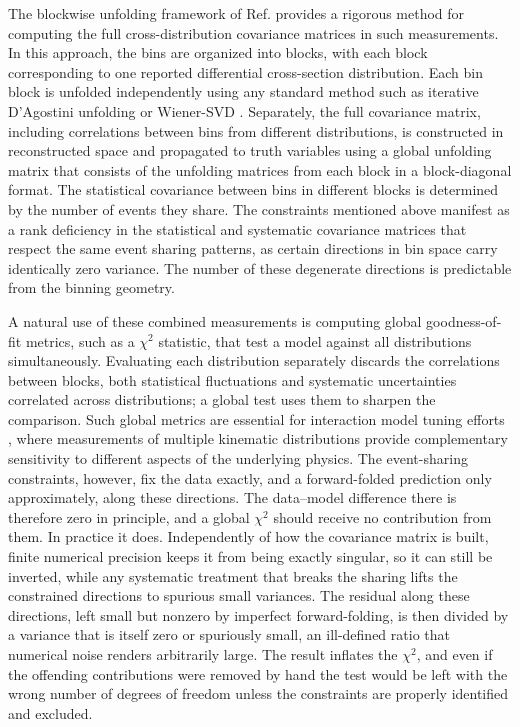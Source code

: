 \documentclass[a4paper,11pt]{article}
\begin{document}
The blockwise unfolding framework of Ref. \cite{Gardiner:2024gdy} provides a rigorous method for computing the full cross-distribution covariance matrices in such measurements. In this approach, the bins are organized into blocks, with each block corresponding to one reported differential cross-section distribution. Each bin block is unfolded independently using any standard method such as iterative D'Agostini unfolding \cite{DAgostini:1994fjx} or Wiener-SVD \cite{Tang:2017rob}. Separately, the full covariance matrix, including correlations between bins from different distributions, is constructed in reconstructed space and propagated to truth variables using a global unfolding matrix that consists of the unfolding matrices from each block in a block-diagonal format. The statistical covariance between bins in different blocks is determined by the number of events they share. The constraints mentioned above manifest as a rank deficiency in the statistical and systematic covariance matrices that respect the same event sharing patterns, as certain directions in bin space carry identically zero variance. The number of these degenerate directions is predictable from the binning geometry.

A natural use of these combined measurements is computing global goodness-of-fit metrics, such as a $\chi^{2}$ statistic, that test a model against all distributions simultaneously. Evaluating each distribution separately discards the correlations between blocks, both statistical fluctuations and systematic uncertainties correlated across distributions; a global test uses them to sharpen the comparison. Such global metrics are essential for interaction model tuning efforts \cite{Wilkinson:2016wmz,MINERvA:2019kfr,GENIE:2022qrc}, where measurements of multiple kinematic distributions provide complementary sensitivity to different aspects of the underlying physics. The event-sharing constraints, however, fix the data exactly, and a forward-folded prediction only approximately, along these directions. The data--model difference there is therefore zero in principle, and a global $\chi^{2}$ should receive no contribution from them. In practice it does. Independently of how the covariance matrix is built, finite numerical precision keeps it from being exactly singular, so it can still be inverted, while any systematic treatment that breaks the sharing lifts the constrained directions to spurious small variances. The residual along these directions, left small but nonzero by imperfect forward-folding, is then divided by a variance that is itself zero or spuriously small, an ill-defined ratio that numerical noise renders arbitrarily large. The result inflates the $\chi^{2}$, and even if the offending contributions were removed by hand the test would be left with the wrong number of degrees of freedom unless the constraints are properly identified and excluded.
\end{document}
